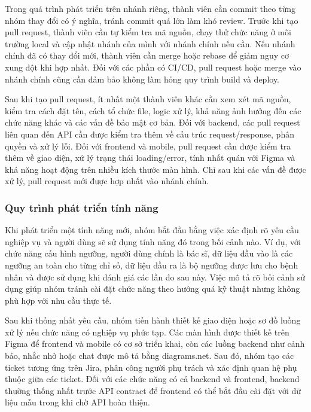 \par Trong quá trình phát triển trên nhánh riêng, thành viên cần commit theo từng nhóm thay đổi có ý nghĩa, tránh commit quá lớn làm khó review. Trước khi tạo pull request, thành viên cần tự kiểm tra mã nguồn, chạy thử chức năng ở môi trường local và cập nhật nhánh của mình với nhánh chính nếu cần. Nếu nhánh chính đã có thay đổi mới, thành viên cần merge hoặc rebase để giảm nguy cơ xung đột khi hợp nhất. Đối với các phần có CI/CD, pull request hoặc merge vào nhánh chính cũng cần đảm bảo không làm hỏng quy trình build và deploy.

\par Sau khi tạo pull request, ít nhất một thành viên khác cần xem xét mã nguồn, kiểm tra cách đặt tên, cách tổ chức file, logic xử lý, khả năng ảnh hưởng đến các chức năng khác và các vấn đề bảo mật cơ bản. Đối với backend, các pull request liên quan đến API cần được kiểm tra thêm về cấu trúc request/response, phân quyền và xử lý lỗi. Đối với frontend và mobile, pull request cần được kiểm tra thêm về giao diện, xử lý trạng thái loading/error, tính nhất quán với Figma và khả năng hoạt động trên nhiều kích thước màn hình. Chỉ sau khi các vấn đề được xử lý, pull request mới được hợp nhất vào nhánh chính.

\subsubsection{Quy trình phát triển tính năng}
\par Khi phát triển một tính năng mới, nhóm bắt đầu bằng việc xác định rõ yêu cầu nghiệp vụ và người dùng sẽ sử dụng tính năng đó trong bối cảnh nào. Ví dụ, với chức năng cấu hình ngưỡng, người dùng chính là bác sĩ, dữ liệu đầu vào là các ngưỡng an toàn cho từng chỉ số, dữ liệu đầu ra là bộ ngưỡng được lưu cho bệnh nhân và được sử dụng khi đánh giá các lần đo sau này. Việc mô tả rõ bối cảnh sử dụng giúp nhóm tránh cài đặt chức năng theo hướng quá kỹ thuật nhưng không phù hợp với nhu cầu thực tế.

\par Sau khi thống nhất yêu cầu, nhóm tiến hành thiết kế giao diện hoặc sơ đồ luồng xử lý nếu chức năng có nghiệp vụ phức tạp. Các màn hình được thiết kế trên Figma để frontend và mobile có cơ sở triển khai, còn các luồng backend như cảnh báo, nhắc nhở hoặc chat được mô tả bằng diagrams.net. Sau đó, nhóm tạo các ticket tương ứng trên Jira, phân công người phụ trách và xác định quan hệ phụ thuộc giữa các ticket. Đối với các chức năng có cả backend và frontend, backend thường thống nhất trước API contract để frontend có thể bắt đầu cài đặt với dữ liệu mẫu trong khi chờ API hoàn thiện.

